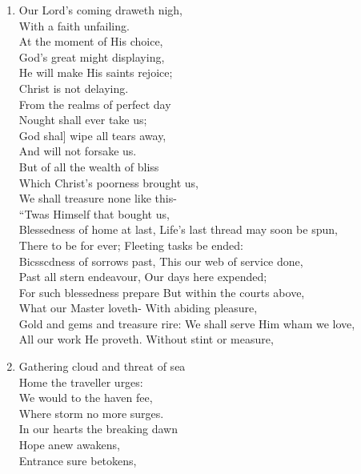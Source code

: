 \documentclass[11pt,a4paper]{article}
\begin{document}
\begin{enumerate}
    \item Our Lord's coming draweth nigh, \\
        With a faith unfailing. \\
        At the moment of His choice, \\
        God's great might displaying, \\
        He will make His saints rejoice; \\
        Christ is not delaying. \\
        From the realms of perfect day \\
        Nought shall ever take us; \\
        God shal] wipe all tears away, \\
        And will not forsake us. \\
        But of all the wealth of bliss \\
        Which Christ's poorness brought us, \\
        We shall treasure none like this- \\
        ``Twas Himself that bought us, \\
        Blessedness of home at last, Life's last thread may soon be spun, \\
        There to be for ever; Fleeting tasks be ended: \\
        Bicsscdness of sorrows past, This our web of service done, \\
        Past all stern endeavour, Our days here expended; \\
        For such blessedness prepare But within the courts above, \\
        What our Master loveth- With abiding pleasure, \\
        Gold and gems and treasure rire: We shall serve Him wham we love, \\
        All our work He proveth. Without stint or measure,

    \item Gathering cloud and threat of sea \\
        Home the traveller urges: \\
        We would to the haven fee, \\
        Where storm no more surges. \\
        In our hearts the breaking dawn \\
        Hope anew awakens, \\
        Entrance sure betokens,

\end{enumerate}
\end{document}

